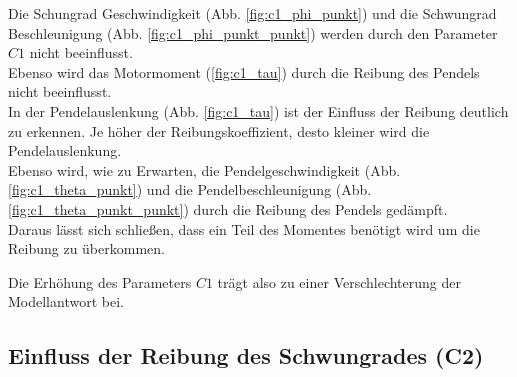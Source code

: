 Die Schungrad Geschwindigkeit (Abb. \ref{fig:c1_phi_punkt}) und die Schwungrad Beschleunigung (Abb. \ref{fig:c1_phi_punkt_punkt}) werden durch den Parameter $C1$ nicht beeinflusst.\\
Ebenso wird das Motormoment (\ref{fig:c1_tau}) durch die Reibung des Pendels nicht beeinflusst.\\

In der Pendelauslenkung (Abb. \ref{fig:c1_tau}) ist der Einfluss der Reibung deutlich zu erkennen. Je höher der Reibungskoeffizient, desto kleiner wird die Pendelauslenkung.\\
Ebenso wird, wie zu Erwarten, die Pendelgeschwindigkeit (Abb. \ref{fig:c1_theta_punkt}) und die Pendelbeschleunigung (Abb. \ref{fig:c1_theta_punkt_punkt}) durch die Reibung des Pendels gedämpft.\\
Daraus lässt sich schließen, dass ein Teil des Momentes benötigt wird um die Reibung zu überkommen. 

Die Erhöhung des Parameters $C1$ trägt also zu einer Verschlechterung der Modellantwort bei.
\subsection*{Einfluss der Reibung des Schwungrades (C2)}

